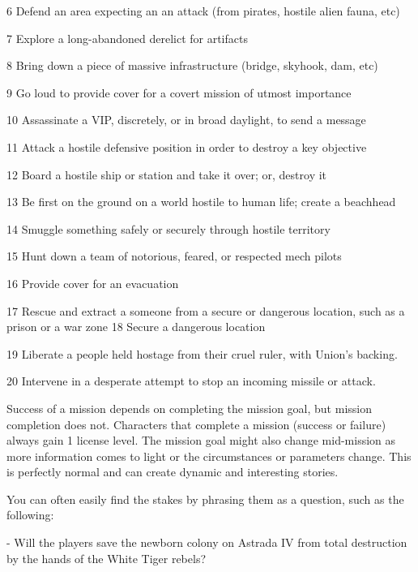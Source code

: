  6         Defend an area expecting an an attack (from pirates, hostile alien fauna, etc) 

 7         Explore a long-abandoned derelict for artifacts 

 8         Bring down a piece of massive infrastructure (bridge, skyhook, dam, etc) 

 9         Go loud to provide cover for a covert mission of utmost importance 

  10       Assassinate a VIP, discretely, or in broad daylight, to send a message 

  11       Attack a hostile defensive position in order to destroy a key objective 

  12       Board a hostile ship or station and take it over; or, destroy it 

  13       Be first on the ground on a world hostile to human life; create a beachhead 

  14       Smuggle something safely or securely through hostile territory 

  15       Hunt down a team of notorious, feared, or respected mech pilots 

  16       Provide cover for an evacuation 

  17       Rescue and extract a someone from a secure or dangerous location, such as a prison  
           or a war zone 
  18       Secure a dangerous location 

  19       Liberate a people held hostage from their cruel ruler, with Union’s backing. 

  20       Intervene in a desperate attempt to stop an incoming missile or attack. 

Success of a mission depends on completing the mission goal, but mission completion does  
not. Characters that complete a mission (success or failure) always gain 1 license level. The  
mission goal might also change mid-mission as more information comes to light or the  
circumstances or parameters change. This is perfectly normal and can create dynamic and  
interesting stories.
 

                                                                                                                 


You can often easily find the stakes by phrasing them as a question, such as the following:
 
     -   Will the players save the newborn colony on Astrada IV from total destruction by the  
         hands of the White Tiger rebels?
 
